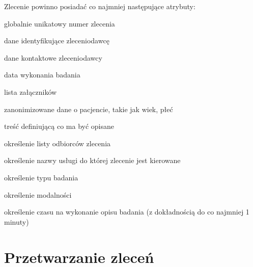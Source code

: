 \documentclass[a4paper]{report}
\begin{document}
Zlecenie powinno posiadać co najmniej następujące atrybuty:
\begin{enumerate*}
\item globalnie unikatowy numer zlecenia
\item dane identyfikujące zleceniodawcę
\item dane kontaktowe zleceniodawcy
\item data wykonania badania
\item lista załączników 
\item zanonimizowane dane o pacjencie, takie jak wiek, płeć
\item treść definiującą co ma być opisane
\item określenie listy odbiorców zlecenia
\item określenie nazwy usługi do której zlecenie jest kierowane
\item określenie typu badania
\item określenie modalności
\item określenie czasu na wykonanie opisu badania (z dokładnością do co najmniej 1 minuty)
\end{enumerate*}

\section{Przetwarzanie zleceń}
\end{document}
